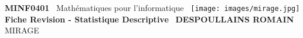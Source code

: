 \documentclass{article}
\newcommand{\CoursCode}{MINF0401}
\newcommand{\ProjetNom}{MIRAGE}
\newcommand{\AuteurNom}{DESPOULLAINS ROMAIN}
\begin{document}
\begin{titlepage}
    \centering
    \vspace*{1cm}
    \textbf{\LARGE \CoursCode}\
    \vspace{0.5cm}
    {\Large Mathématiques pour l'informatique}\
    \vfill
    \texttt{[image: images/mirage.jpg]}
    {\Huge \textbf{Fiche Revision - Statistique Descriptive}}\
    \vspace{1cm}
    {\Large \textbf{\AuteurNom}}\
    \vfill
    {\Large \ProjetNom}
\end{titlepage}

\tableofcontents
\pagebreak
\end{document}
